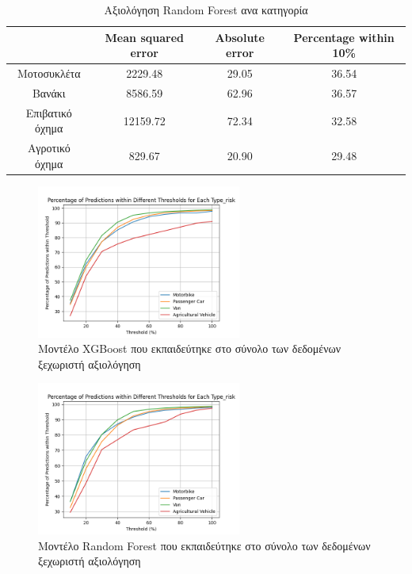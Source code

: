 \documentclass{llncs}
\begin{document}
\begin{table}
    \centering
    \begin{tabular}{|c|c|c|c|} %
        \hline
         &Mean squared error & Absolute error & Percentage within 10\% \\ %
        \hline
        Μοτοσυκλέτα & 2229.48 & 29.05 & 36.54 \\
        Βανάκι & 8586.59 & 62.96 & 36.57 \\
        Επιβατικό όχημα & 12159.72 & 72.34 & 32.58 \\
        Αγροτικό όχημα & 829.67 & 20.90 & 29.48 \\
        \hline
    \end{tabular}
    \caption{Αξιολόγηση Random Forest ανα κατηγορία}
    \label{tab:RandomForest_cat_together}
\end{table}


\begin{figure}
    \begin{center}
        \includegraphics[width=0.6\textwidth]{images/combined_trained_individual_thresholds_xgb.png}
    \end{center}
    \caption{Μοντέλο XGBoost που εκπαιδεύτηκε στο σύνολο των δεδομένων ξεχωριστή αξιολόγηση}  
    \label{fig:XGBoost_result_all_individual}  
\end{figure}

\begin{figure}
    \begin{center}
        \includegraphics[width=0.6\textwidth]{images/combined_trained_individual_thresholds_random_forest.png}
    \end{center}
    \caption{Μοντέλο Random Forest που εκπαιδεύτηκε στο σύνολο των δεδομένων ξεχωριστή αξιολόγηση}  
    \label{fig:random_forest_result_all_individual}  
\end{figure}
\end{document}
